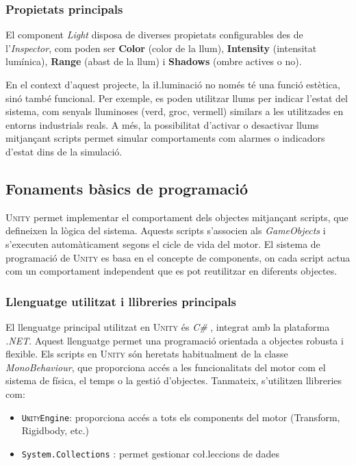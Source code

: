 \documentclass[a4paper,11pt,DIV=13,headings=normal,abstract=true,twoside=semi]{article}
\newcommand{\acro}[1]{\textsc{#1}}
\begin{document}
\subsubsection*{Propietats principals}

El component \emph{Light} disposa de diverses propietats configurables des de l'\emph{Inspector}, com poden ser \textbf{Color} (color de la llum), \textbf{Intensity} (intensitat lumínica), \textbf{Range} (abast de la llum) i \textbf{Shadows} (ombre actives o no).

En el context d'aquest projecte, la i\l.luminació no només té una funció estètica, sinó també funcional. Per exemple, es poden utilitzar llums per indicar l'estat del sistema, com senyals lluminoses (verd, groc, vermell) similars a les utilitzades en entorns industrials reals. A més, la possibilitat d'activar o desactivar llums mitjançant scripts permet simular comportaments com alarmes o indicadors d'estat dins de la simulació.

\subsection{Fonaments bàsics de programació}

\acro{Unity} permet implementar el comportament dels objectes mitjançant scripts, que defineixen la lògica del sistema. Aquests scripts s'associen als \emph{GameObjects} i s'executen automàticament segons el cicle de vida del motor. El sistema de programació de \acro{Unity} es basa en el concepte de components, on cada script actua com un comportament independent que es pot reutilitzar en diferents objectes.

\subsubsection{Llenguatge utilitzat i llibreries principals}

El llenguatge principal utilitzat en \acro{Unity} és \emph{C\#} \cite{UnityProgrammingGuide}, integrat amb la plataforma \emph{.NET}. Aquest llenguatge permet una programació orientada a objectes robusta i flexible. Els scripts en \acro{Unity} són heretats habitualment de la classe \emph{MonoBehaviour}, que proporciona accés a les funcionalitats del motor com el sistema de física, el temps o la gestió d'objectes. Tanmateix, s'utilitzen llibreries com:

\begin{itemize}
    \item \texttt{\acro{Unity}Engine}: proporciona accés a tots els components del motor (Transform, Rigidbody, etc.)
    \item \texttt{System.Collections} \cite{dotnet_collections}: permet gestionar co\l.leccions de dades
\end{itemize}
\end{document}

